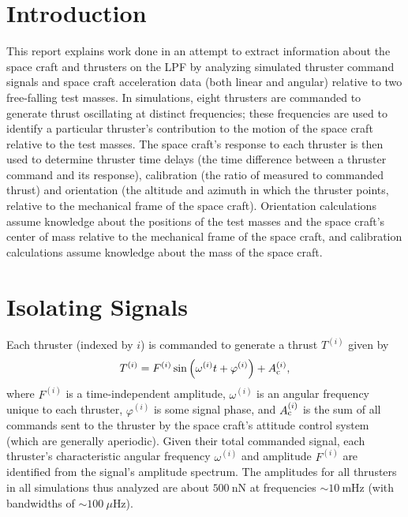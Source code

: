 \documentclass[10pt,twocolumn]{article}
\makeatletter
\newcommand{\psl}{6pt} %
\newcommand{\head}[1]{
\twocolumn[\begin{@twocolumnfalse}
\vspace{-5mm}
\begin{center} #1 \end{center}
\end{@twocolumnfalse}]}
\renewcommand{\t}{\text} %
\newcommand{\p}[1]{\left(#1\right)} %
\renewcommand{\phi}{\varphi} %
\newcommand{\ti}{^{\p{i}}}
\makeatother
\begin{document}
\titlespacing{\section}{0pt}{\psl}{0pt}
\titlespacing{\subsection}{5mm}{\psl}{0pt}

\head{ \large \bf LPF Internship Progress Report (Week 3 of 10) }

\section*{Introduction}

This report explains work done in an attempt to extract information
about the space craft and thrusters on the LPF by analyzing simulated
thruster command signals and space craft acceleration data (both
linear and angular) relative to two free-falling test masses. In
simulations, eight thrusters are commanded to generate thrust
oscillating at distinct frequencies; these frequencies are used to
identify a particular thruster's contribution to the motion of the
space craft relative to the test masses. The space craft's response to
each thruster is then used to determine thruster time delays (the time
difference between a thruster command and its response), calibration
(the ratio of measured to commanded thrust) and orientation (the
altitude and azimuth in which the thruster points, relative to the
mechanical frame of the space craft). Orientation calculations assume
knowledge about the positions of the test masses and the space craft's
center of mass relative to the mechanical frame of the space craft,
and calibration calculations assume knowledge about the mass of the
space craft.

\section*{Isolating Signals}

Each thruster (indexed by $i$) is commanded to generate a thrust
$T\ti$ given by
\begin{align}
  T\ti=F\ti\sin\p{\omega\ti t+\phi\ti}+A_{\t c}\ti,
\end{align}
where $F\ti$ is a time-independent amplitude, $\omega\ti$ is an
angular frequency unique to each thruster, $\phi\ti$ is some signal
phase, and $A_{\t c}\ti$ is the sum of all commands sent to the
thruster by the space craft's attitude control system (which are
generally aperiodic). Given their total commanded signal, each
thruster's characteristic angular frequency $\omega\ti$ and amplitude
$F\ti$ are identified from the signal's amplitude spectrum. The
amplitudes for all thrusters in all simulations thus analyzed are
about $500~\t{nN}$ at frequencies $\sim10~\t{mHz}$ (with bandwidths of
$\sim100~\mu\t{Hz}$).
\end{document}
